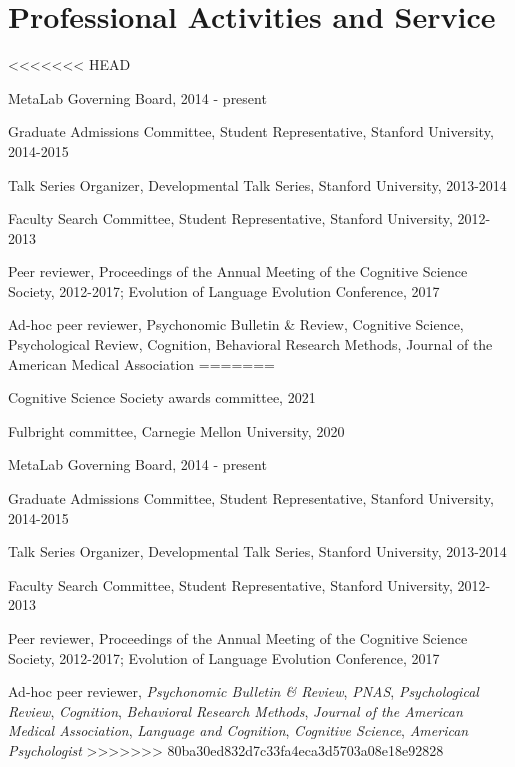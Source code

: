 \documentclass[letterpaper]{article}
\renewenvironment{itemize}{
  \begin{list}{}{
    \setlength{\leftmargin}{1.5em}
  }
}{
  \end{list}
}
\begin{document}
\section*{Professional Activities and Service}
\begin{itemize}
<<<<<<< HEAD
\item MetaLab Governing Board, 2014 - present
\item Graduate Admissions Committee, Student Representative, Stanford University, 2014-2015
\item  Talk Series Organizer, Developmental Talk Series, Stanford University, 2013-2014
\item Faculty Search Committee,  Student Representative,  Stanford University, 2012-2013 
\item Peer reviewer, Proceedings of the Annual Meeting of the Cognitive Science Society, 2012-2017; Evolution of Language Evolution Conference, 2017
\item Ad-hoc peer reviewer, Psychonomic Bulletin \& Review, Cognitive Science, Psychological Review, Cognition, Behavioral Research Methods,  Journal of the American Medical Association
=======
\item Cognitive Science Society awards committee, 2021
\item Fulbright committee, Carnegie Mellon University, 2020
\item MetaLab Governing Board, 2014 - present
\item Graduate Admissions Committee, Student Representative, Stanford University, 2014-2015
\item  Talk Series Organizer, Developmental Talk Series, Stanford University, 2013-2014
\item Faculty Search Committee,  Student Representative,  Stanford University, 2012-2013
\item Peer reviewer, Proceedings of the Annual Meeting of the Cognitive Science Society, 2012-2017; Evolution of Language Evolution Conference, 2017
\item Ad-hoc peer reviewer, {\it Psychonomic Bulletin \& Review},  {\it PNAS},  {\it Psychological Review},  {\it Cognition},  {\it Behavioral Research Methods},  {\it Journal of the American Medical Association},  {\it Language and Cognition},   {\it Cognitive Science},   {\it American Psychologist}
>>>>>>> 80ba30ed832d7c33fa4eca3d5703a08e18e92828
\end{itemize}



\end{document}
